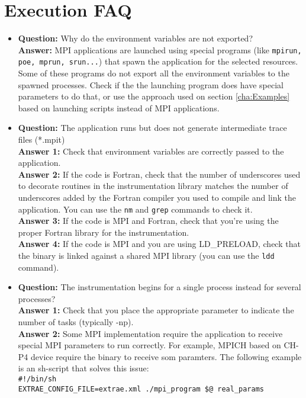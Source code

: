 \section{Execution FAQ}

\begin{itemize}

\item {\bf Question:} Why do the environment variables are not exported?\\
      {\bf Answer:  } MPI applications are launched using special programs (like {\tt mpirun, poe, mprun, srun...}) that spawn the application for the selected resources. Some of these programs do not export all the environment variables to the spawned processes. Check if the the launching program does have special parameters to do that, or use the approach used on section \ref{cha:Examples} based on launching scripts instead of MPI applications.

\item {\bf Question:} The application runs but does not generate intermediate trace files (*.mpit)\\
      {\bf Answer 1:} Check that environment variables are correctly passed to the application.\\
      {\bf Answer 2:} If the code is Fortran, check that the number of underscores used to decorate routines in the instrumentation library matches the number of underscores added by the Fortran compiler you used to compile and link the application. You can use the {\tt nm} and {\tt grep} commands to check it.\\
      {\bf Answer 3:} If the code is MPI and Fortran, check that you're using the proper Fortran library for the instrumentation.\\
      {\bf Answer 4:} If the code is MPI and you are using LD\_PRELOAD, check that the binary is linked against a shared MPI library (you can use the {\tt ldd} command).\\

\item {\bf Question:} The instrumentation begins for a single process instead for several processes?\\
      {\bf Answer 1:} Check that you place the appropriate parameter to indicate the number of tasks (typically -np).\\
      {\bf Answer 2:} Some MPI implementation require the application to receive special MPI parameters to run correctly. For example, MPICH based on CH-P4 device require the binary to receive som paramters. The following example is an sh-script that solves this issue:\\
      {\tt \#!/bin/sh\\
           EXTRAE\_CONFIG\_FILE=extrae.xml ./mpi\_program \$@ real\_params}\\


\end{itemize}
